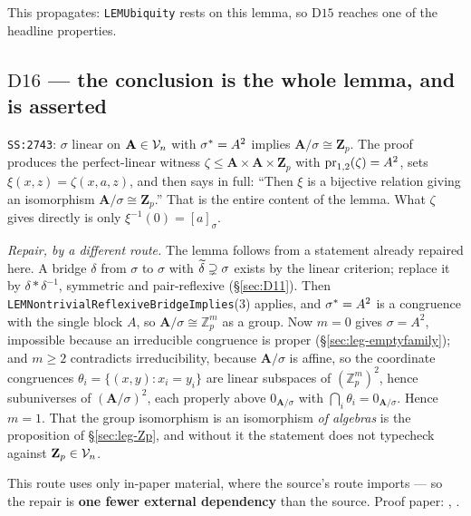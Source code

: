 This propagates: \texttt{LEMUbiquity} rests on this lemma, so $\mathrm D{15}$
reaches one of the headline properties.

\subsection{$\mathrm D{16}$ --- the conclusion is the whole lemma, and is asserted}
\label{sec:D16}

\texttt{SS:2743}: $\sigma$ linear on $\mathbf A\in\mathcal V_{n}$ with
$\sigma^{*}=A^{2}$ implies $\mathbf A/\sigma\cong\mathbf Z_{p}$. The proof
produces the perfect-linear witness $\zeta\le\mathbf A\times\mathbf A\times
\mathbf Z_{p}$ with $\operatorname*{pr}_{1,2}(\zeta)=A^{2}$, sets $\xi(x,z)=\zeta(x,a,z)$,
and then says in full: ``Then $\xi$ is a bijective relation giving an
isomorphism $\mathbf A/\sigma\cong\mathbf Z_{p}$.'' That is the entire content
of the lemma. What $\zeta$ gives directly is only $\xi^{-1}(0)=[a]_{\sigma}$.

\emph{Repair, by a different route.} The lemma follows from a statement already
repaired here. A bridge $\delta$ from $\sigma$ to $\sigma$ with
$\widetilde{\delta}\supsetneq\sigma$ exists by the linear criterion; replace it by
$\delta\ast\delta^{-1}$, symmetric and pair-reflexive
(\S\ref{sec:D11}). Then \texttt{LEMNontrivialReflexiveBridgeImplies}(3)
applies, and $\sigma^{*}=A^{2}$ is a congruence with the single block $A$, so
$\mathbf A/\sigma\cong\mathbb Z_{p}^{m}$ as a group. Now $m=0$ gives
$\sigma=A^{2}$, impossible because an irreducible congruence is proper
(\S\ref{sec:leg-emptyfamily}); and $m\ge2$ contradicts irreducibility, because
$\mathbf A/\sigma$ is affine, so the coordinate congruences
$\theta_{i}=\{(x,y):x_{i}=y_{i}\}$ are linear subspaces of
$(\mathbb Z_{p}^{m})^{2}$, hence subuniverses of $(\mathbf A/\sigma)^{2}$, each
properly above $0_{\mathbf A/\sigma}$ with $\bigcap_{i}\theta_{i}=
0_{\mathbf A/\sigma}$. Hence $m=1$. That the group isomorphism is an
isomorphism \emph{of algebras} is the proposition of
\S\ref{sec:leg-Zp}, and without it the statement does not typecheck against
$\mathbf Z_{p}\in\mathcal V_{n}$.

This route uses only in-paper material, where the source's route imports
\cite[Cor.~8.17.1]{ZhukJACM} --- so the repair is \textbf{one fewer external
dependency} than the source. Proof paper: ,
.

